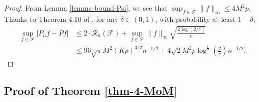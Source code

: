 \documentclass[11pt]{article}
\begin{document}
\begin{proof}
    From Lemma \ref{lemma-bound-Psi}, we see that $\sup_{f\in \mathcal{F}}\|f\|_{\infty}\le 4M^2p$. Thanks to Theorem 4.10 of \cite{wainwright_2019}, for any $\delta \in (0,1)$, with probability at least $1-\delta$, 
    \begin{align*}
        \sup_{f\in \mathcal{F}}|P_n f-Pf| &\le 2\cdot\mathcal{R}_n(\mathcal{F})+\sup_{f\in \mathcal{F}}\|f\|_{\infty}\sqrt{\frac{2\log(2/\delta)}{n}}\\
        &\le 96\sqrt{\pi}M^2(Kp)^{3/2}n^{-1/2}+4\sqrt{2}M^2p\log^{\tfrac{1}{2}}\left(\frac{2}{\delta}\right) n^{-1/2}.
    \end{align*}
\end{proof}


\subsection{Proof of Theorem \ref{thm-4-MoM}}
\end{document}

